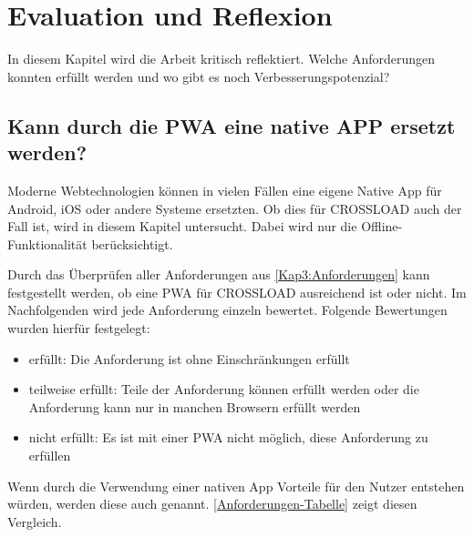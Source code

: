 \chapter{Evaluation und Reflexion}
\label{Kap6}
In diesem Kapitel wird die Arbeit kritisch reflektiert. Welche Anforderungen konnten erfüllt werden und wo gibt es noch Verbesserungspotenzial?

\section{Kann durch die PWA eine native APP ersetzt werden?}
Moderne Webtechnologien können in vielen Fällen eine eigene Native App für Android, iOS oder andere Systeme ersetzten. Ob dies für CROSSLOAD auch der Fall ist, wird in diesem Kapitel untersucht. Dabei wird nur die Offline-Funktionalität berücksichtigt.

Durch das Überprüfen aller Anforderungen aus \autoref{Kap3:Anforderungen} kann festgestellt werden, ob eine \ac{PWA} für CROSSLOAD ausreichend ist oder nicht. Im Nachfolgenden wird jede Anforderung einzeln bewertet. Folgende Bewertungen wurden hierfür festgelegt:
\begin{itemize}
\item erfüllt: Die Anforderung ist ohne Einschränkungen erfüllt
\item teilweise erfüllt: Teile der Anforderung können erfüllt werden oder die Anforderung kann nur in manchen Browsern erfüllt werden
\item nicht erfüllt: Es ist mit einer \ac{PWA} nicht möglich, diese Anforderung zu erfüllen
\end{itemize}

Wenn durch die Verwendung einer nativen App Vorteile für den Nutzer entstehen würden, werden diese auch genannt. \autoref{Anforderungen-Tabelle} zeigt diesen Vergleich.

